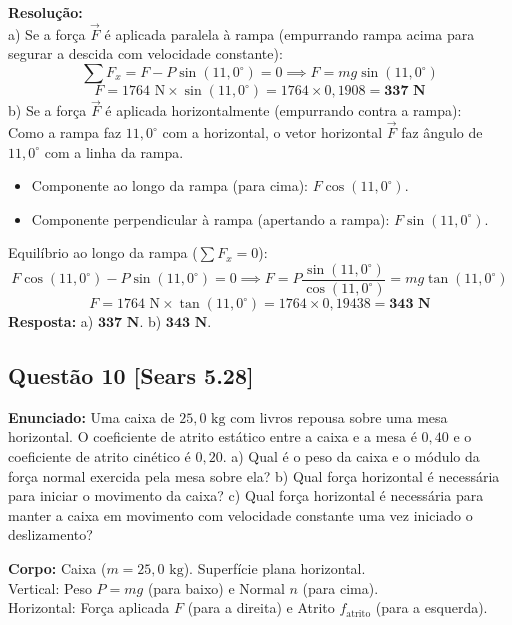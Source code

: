 \documentclass[11pt,a4paper]{article}
\begin{document}
\noindent
\textbf{Resolução:}\\
a) Se a força $\vec{F}$ é aplicada paralela à rampa (empurrando rampa acima para segurar a descida com velocidade constante):
\[ \sum F_x = F - P\sin(11,0^\circ) = 0 \implies F = mg\sin(11,0^\circ) \]
\[ F = 1764\text{ N} \times \sin(11,0^\circ) = 1764 \times 0,1908 = \mathbf{337\text{ N}} \]
b) Se a força $\vec{F}$ é aplicada horizontalmente (empurrando contra a rampa):\\
Como a rampa faz $11,0^\circ$ com a horizontal, o vetor horizontal $\vec{F}$ faz ângulo de $11,0^\circ$ com a linha da rampa.
\begin{itemize}
    \item Componente ao longo da rampa (para cima): $F \cos(11,0^\circ)$.
    \item Componente perpendicular à rampa (apertando a rampa): $F \sin(11,0^\circ)$.
\end{itemize}
Equilíbrio ao longo da rampa ($\sum F_x = 0$):
\[ F\cos(11,0^\circ) - P\sin(11,0^\circ) = 0 \implies F = P \frac{\sin(11,0^\circ)}{\cos(11,0^\circ)} = mg \tan(11,0^\circ) \]
\[ F = 1764\text{ N} \times \tan(11,0^\circ) = 1764 \times 0,19438 = \mathbf{343\text{ N}} \]
\textbf{Resposta:} a) $\mathbf{337\text{ N}}$. b) $\mathbf{343\text{ N}}$.

\vspace{0.3cm}
\subsection*{Questão 10 [Sears 5.28]}
\textbf{Enunciado:} Uma caixa de $25,0\text{ kg}$ com livros repousa sobre uma mesa horizontal. O coeficiente de atrito estático entre a caixa e a mesa é $0,40$ e o coeficiente de atrito cinético é $0,20$. a) Qual é o peso da caixa e o módulo da força normal exercida pela mesa sobre ela? b) Qual força horizontal é necessária para iniciar o movimento da caixa? c) Qual força horizontal é necessária para manter a caixa em movimento com velocidade constante uma vez iniciado o deslizamento?

\begin{dclbox}
\textbf{Corpo:} Caixa ($m = 25,0\text{ kg}$). Superfície plana horizontal.\\
Vertical: Peso $P = mg$ (para baixo) e Normal $n$ (para cima).\\
Horizontal: Força aplicada $F$ (para a direita) e Atrito $f_{\text{atrito}}$ (para a esquerda).
\end{dclbox}
\end{document}
